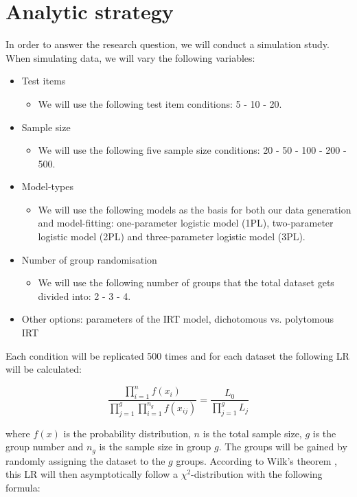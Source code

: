 \documentclass{article}
\begin{document}
\part{Analytic strategy}
In order to answer the research question, we will conduct a simulation study. When simulating data, we will vary the following variables:

\begin{itemize}
\item Test items
	\begin{itemize}
	\item We will use the following test item conditions: 5 - 10 - 20.
	\end{itemize}
\item Sample size
	\begin{itemize}
	\item We will use the following five sample size conditions: 20 - 50 - 100 - 200 - 500.
	\end{itemize}
\item Model-types
	\begin{itemize}
	\item We will use the following models as the basis for both our data generation and model-fitting: one-parameter logistic model (1PL), two-parameter logistic model (2PL) and three-parameter logistic model (3PL).
	\end{itemize}
\item Number of group randomisation
	\begin{itemize}
	\item We will use the following number of groups that the total dataset gets divided into: 2 - 3 - 4.
	\end{itemize}
\item Other options: parameters of the IRT model, dichotomous vs. polytomous IRT
\end{itemize}

Each condition will be replicated 500 times and for each dataset the following LR will be calculated:

\begin{equation}
\frac{\prod_{i=1}^n f(x_i)}{\prod_{j=1}^g\prod_{i=1}^{n_g} f(x_{ij})} = \frac{L_0}{\prod_{j = 1}^g L_j}
\end{equation}

where $f(x)$ is the probability distribution, $n$ is the total sample size, $g$ is the group number and $n_g$ is the sample size in group $g$. The groups will be gained by randomly assigning the dataset to the $g$ groups. According to Wilk's theorem \autocite{wilkth}, this LR will then asymptotically follow a $\chi^2$-distribution with the following formula:
\end{document}
